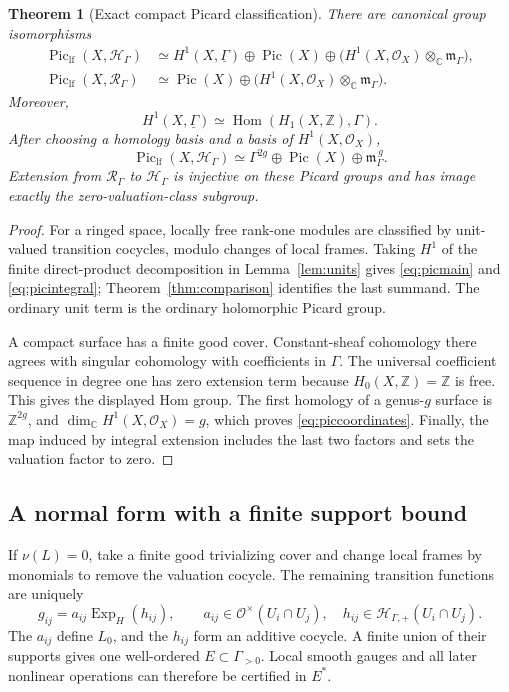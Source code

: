 \documentclass[11pt,letterpaper]{article}
\numberwithin{equation}{section}
\newtheorem{theorem}{Theorem}[section]
\theoremstyle{definition}
\theoremstyle{remark}
\newcommand{\C}{\mathbb C}
\newcommand{\Z}{\mathbb Z}
\newcommand{\HH}{\mathcal H}
\newcommand{\RR}{\mathcal R}
\newcommand{\OO}{\mathcal O}
\newcommand{\mm}{\mathfrak m}
\newcommand{\Pic}{\operatorname{Pic}}
\newcommand{\Piclf}{\operatorname{Pic}_{\mathrm{lf}}}
\newcommand{\Hom}{\operatorname{Hom}}
\newcommand{\Exp}{\operatorname{Exp}_{H}}
\newcommand{\Hp}{\HH_{\Gamma,+}}
\newcommand{\Hg}{\HH_\Gamma}
\newcommand{\Rg}{\RR_\Gamma}
\newcommand{\mg}{\mm_\Gamma}
\newcommand{\vclass}{\nu}
\newcommand{\ot}{\otimes_{\C}}
\begin{document}
\begin{theorem}[Exact compact Picard classification]
\label{thm:pic}
There are canonical group isomorphisms
\begin{align}
 \Piclf(X,\Hg)
 &\simeq H^1(X,\underline\Gamma)\oplus\Pic(X)
       \oplus\bigl(H^1(X,\OO_X)\ot\mg\bigr),\label{eq:picmain}\\
 \Piclf(X,\Rg)
 &\simeq\Pic(X)\oplus\bigl(H^1(X,\OO_X)\ot\mg\bigr).
 \label{eq:picintegral}
\end{align}
Moreover,
\[
 H^1(X,\underline\Gamma)\simeq\Hom(H_1(X,\Z),\Gamma).
\]
After choosing a homology basis and a basis of $H^1(X,\OO_X)$,
\begin{equation}
 \Piclf(X,\Hg)\simeq\Gamma^{2g}\oplus\Pic(X)\oplus\mg^{\,g}.
 \label{eq:piccoordinates}
\end{equation}
Extension from $\Rg$ to $\Hg$ is injective on these Picard groups and
has image exactly the zero-valuation-class subgroup.
\end{theorem}
\begin{proof}
For a ringed space, locally free rank-one modules are classified by
unit-valued transition cocycles, modulo changes of local frames.
Taking $H^1$ of the finite direct-product decomposition in
Lemma~\ref{lem:units} gives \eqref{eq:picmain} and
\eqref{eq:picintegral}; Theorem~\ref{thm:comparison} identifies the last
summand. The ordinary unit term is the ordinary holomorphic Picard group.

A compact surface has a finite good cover. Constant-sheaf cohomology
there agrees with singular cohomology with coefficients in $\Gamma$.
The universal coefficient sequence in degree one has zero extension
term because $H_0(X,\Z)=\Z$ is free. This gives the displayed Hom group.
The first homology of a genus-$g$ surface is $\Z^{2g}$, and
$\dim_\C H^1(X,\OO_X)=g$, which proves \eqref{eq:piccoordinates}.
Finally, the map induced by integral extension includes the last two
factors and sets the valuation factor to zero.
\end{proof}

\subsection{A normal form with a finite support bound}
If $\vclass(L)=0$, take a finite good trivializing cover and change local
frames by monomials to remove the valuation cocycle. The remaining
transition functions are uniquely
\begin{equation}
 g_{ij}=a_{ij}\Exp(h_{ij}),\qquad
 a_{ij}\in\OO^\times(U_i\cap U_j),\quad h_{ij}\in\Hp(U_i\cap U_j).
 \label{eq:normalcocycle}
\end{equation}
The $a_{ij}$ define $L_0$, and the $h_{ij}$ form an additive cocycle.
A finite union of their supports gives one well-ordered
$E\subset\Gamma_{>0}$. Local smooth gauges and all later nonlinear
operations can therefore be certified in $E^*$.
\end{document}
